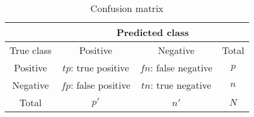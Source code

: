 \begin{table}
    \centering
    \begin{tabular}{|c|c|c|c|}\hline
                &   \multicolumn{3}{c|}{Predicted class}\\\hline
    True class  &  Positive             & Negative              & Total \\\hline
    Positive    & $tp$: true positive   & $fn$: false negative  & $p$   \\
    Negative    & $fp$: false positive  & $tn$: true negative   & $n$   \\\hline
    Total       & $p'$                  & $n'$                  & $N$   \\\hline
    \end{tabular}
    \caption{Confusion matrix}
    \label{tab:confmat}
\end{table}